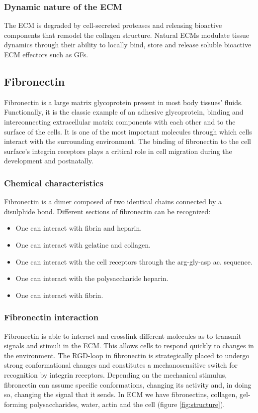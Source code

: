		\subsubsection{Dynamic nature of the ECM}
		The ECM is degraded by cell-secreted proteases and releasing bioactive components that remodel the collagen structure.
		Natural ECMs modulate tissue dynamics through their ability to locally bind, store and release soluble bioactive ECM effectors such as GFs.

	\subsection{Fibronectin}
	Fibronectin is a large matrix glycoprotein present in most body tissues' fluids.
	Functionally, it is the classic example of an adhesive glycoprotein, binding and interconnecting extracellular matrix components with each other and to the surface of the cells.
	It is one of the most important molecules through which cells interact with the surrounding environment.
	The binding of fibronectin to the cell surface’s integrin receptors plays a critical role in cell migration during the development and postnatally.


		\subsubsection{Chemical characteristics}
	Fibronectin is a dimer composed of two identical chains connected by a disulphide bond.
	Different sections of fibronectin can be recognized:

	\begin{multicols}{2}
		\begin{itemize}
			\item One can interact with fibrin and heparin.
			\item One can interact with gelatine and collagen.
			\item One can interact with the cell receptors through the arg-gly-asp ac. sequence.
			\item One can interact with the polysaccharide heparin.
			\item One can interact with fibrin.
		\end{itemize}
	\end{multicols}

		\subsubsection{Fibronectin interaction}
		Fibronectin is able to interact and crosslink different molecules as to transmit signals and stimuli in the ECM.
		This allows cells to respond quickly to changes in the environment.
		The RGD-loop in fibronectin is strategically placed to undergo strong conformational changes and constitutes a mechanosensitive switch for recognition by integrin receptors.
		Depending on the mechanical stimulus, fibronectin can assume specific conformations, changing its activity and, in doing so, changing the signal that it sends.
	In ECM we have fibronectins, collagen, gel-forming polysaccharides, water, actin and the cell (figure \ref{fig:structure}).

